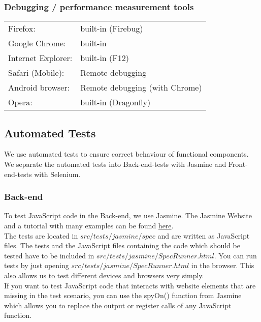 \documentclass[twoside,12pt,a4paper]{article}
\begin{document}
\subsubsection{Debugging / performance measurement tools} %
\label{sub:debugging_tools}

\begin{tabular}{ll}
Firefox:				& built-in (Firebug) \\
Google Chrome: 		& built-in \\
Internet Explorer:	& built-in (F12) \\
Safari (Mobile):	& Remote debugging \\
Android browser:	& Remote debugging (with Chrome) \\
Opera:				& built-in (Dragonfly) \\
\end{tabular}


\subsection{Automated Tests}
We use automated tests to ensure correct behaviour of functional components. We separate the automated tests into Back-end-tests with Jasmine and Front-end-tests with Selenium.

\subsubsection{Back-end}
To test JavaScript code in the Back-end, we use Jasmine. The Jasmine Website and a tutorial with many examples can be found \href{http://jasmine.github.io/2.1/introduction.html}{here}.\\
The tests are located in $src/tests/jasmine/spec$ and are written as JavaScript files. The tests and the JavaScript files containing the code which should be tested have to be included in $src/tests/jasmine/SpecRunner.html$. You can run tests by just opening $src/tests/jasmine/SpecRunner.html$ in the browser. This also allows us to test different devices and browsers very simply.\\
If you want to test JavaScript code that interacts with website elements that are missing in the test scenario, you can use the spyOn() function from Jasmine which allows you to replace the output or register calls of any JavaScript function.
\end{document}
